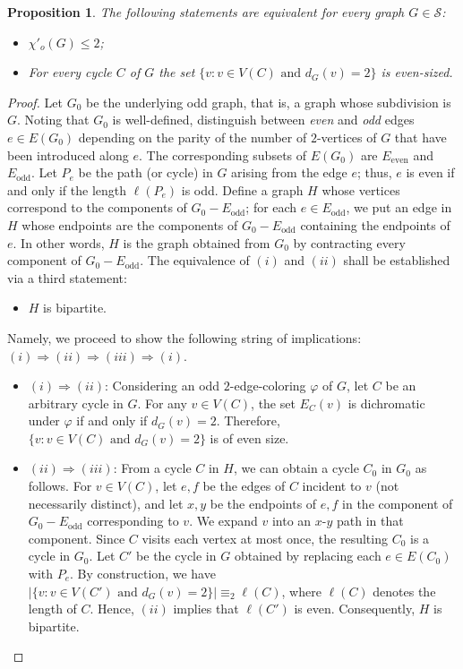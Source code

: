 \documentclass[a4paper,12pt]{article}
\newtheorem{proposition}[theorem]{Proposition}
\numberwithin{equation}{section}
\begin{document}
\begin{proposition} The following statements are equivalent for every graph $G\in \mathcal{S}$:
\begin{itemize}
\item[$(i)$] $\chi'_o(G)\leq2$;
\item[$(ii)$] For every cycle $C$ of $G$ the set $\{v:v\in V(C) \text{ and } d_G(v)=2\}$ is even-sized.
\end{itemize}
\end{proposition}
\begin{proof}
Let $G_0$ be the underlying odd graph, that is, a graph whose subdivision is $G$. Noting that $G_0$ is well-defined, distinguish between \textit{even} and \textit{odd} edges $e\in E(G_0)$ depending on the parity of the number of $2$-vertices of $G$ that have been introduced along $e$. The corresponding subsets of $E(G_0)$ are $E_{\mathrm{even}}$ and $E_{\mathrm{odd}}$. Let $P_e$ be the path (or cycle) in $G$ arising from the edge $e$; thus, $e$ is even if and only if the length $\ell(P_e)$ is odd. Define a graph $H$ whose vertices correspond to the components of $G_0-E_{\mathrm{odd}}$; for each $e\in E_{\mathrm{odd}}$, we put an edge in $H$ whose endpoints are the components of $G_0-E_{\mathrm{odd}}$ containing the endpoints of $e$. In other words, $H$ is the graph obtained from $G_0$ by contracting every component of $G_0-E_{\mathrm{odd}}$. The equivalence of $(i)$ and $(ii)$ shall be established via a third statement:
\begin{itemize}
\item[$(iii)$] $H$ is bipartite.
\end{itemize}
Namely, we proceed to show the following string of implications: $(i)\Rightarrow (ii)\Rightarrow(iii)\Rightarrow(i)$.
\begin{itemize}
\item $(i)\Rightarrow (ii)$: Considering an odd $2$-edge-coloring $\varphi$ of $G$, let $C$ be an arbitrary cycle in $G$. For any $v\in V(C)$, the set $E_C(v)$ is dichromatic under $\varphi$ if and only if $d_G(v)=2$. Therefore, $\{v:v\in V(C) \text{ and } d_G(v)=2\}$ is of even size.
\item $(ii)\Rightarrow(iii)$: From a cycle $C$ in $H$, we can obtain a cycle $C_0$ in $G_0$ as follows. For $v\in V(C)$, let $e,f$ be the edges of $C$ incident to $v$ (not necessarily distinct), and let $x,y$ be the endpoints of $e,f$ in the component of $G_0-E_{\mathrm{odd}}$ corresponding to $v$. We expand $v$ into an $x$-$y$ path in that component. Since $C$ visits each vertex at most once, the resulting $C_0$ is a cycle in $G_0$. Let $C'$ be the cycle in $G$ obtained by replacing each $e\in E(C_0)$ with $P_e$. By construction, we have $|\{v:v\in V(C') \text{ and } d_G(v)=2\}|\equiv_2\ell(C)$, where $\ell(C)$ denotes the length of $C$. Hence, $(ii)$ implies that $\ell(C')$ is even. Consequently, $H$ is bipartite.

\end{itemize}
\end{proof}
\end{document}
